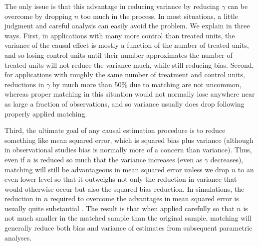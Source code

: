 \documentclass[11pt,titlepage]{article}
\begin{document}
The only issue is that this advantage in reducing variance by reducing
$\gamma$ can be overcome by dropping $n$ too much in the process.  In
most situations, a little judgment and careful analysis can easily
avoid the problem.  We explain in three ways.  First, in applications
with many more control than treated units, the variance of the causal
effect is mostly a function of the number of treated units, and so
losing control units until their number approximates the number of
treated units will not reduce the variance much, while still reducing
bias.  Second, for applications with roughly the same number of
treatment and control units, reductions in $\gamma$ by much more than
50\% due to matching are not uncommon, whereas proper matching in this
situation would not normally lose anywhere near as large a fraction of
observations, and so variance usually does drop following properly
applied matching.

Third, the ultimate goal of any causal estimation procedure is to
reduce something like mean squared error, which is squared bias plus
variance (although in observational studies bias is normally more of a
concern than variance).  Thus, even if $n$ is reduced so much that the
variance increases (even as $\gamma$ decreases), matching will still
be advantageous in mean squared error unless we drop $n$ to an even
lower level so that it outweighs not only the reduction in variance
that would otherwise occur but also the squared bias reduction.  In
simulations, the reduction in $n$ required to overcome the advantages
in mean squared error is usually quite substantial \citep{RubTho96}.
The result is that when applied carefully so that $n$ is not much
smaller in the matched sample than the original sample, matching will
generally reduce both bias and variance of estimates from subsequent
parametric analyses.
\end{document}
